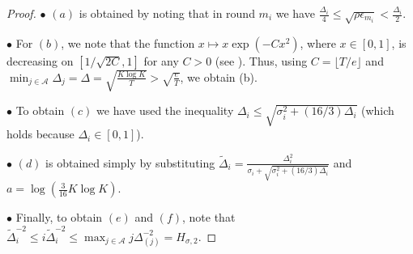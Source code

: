 \begin{proof}
\noindent
 $\bullet$ $(a)$ is obtained by noting that in round $m_i$ we have 
 $\frac{\Delta_i}{4}\leq\sqrt{\rho\epsilon_{m_{i}}}<\frac{\Delta_i}{2}.$

\noindent
 $\bullet$ For $(b)$, we note that the function $x\mapsto x\exp(-Cx^2)$, where $x\in[0,1]$, is  decreasing on $[1/\sqrt{2C},1]$ for any $C>0$ (see \cite{bubeck2011pure,auer2010ucb}). Thus, using $C=\lfloor T/e\rfloor$ and $\min_{j\in \mathcal{A}}\Delta_j =\Delta =\sqrt{\frac{K\log K}{T}} > \sqrt{\frac{e}{T}}$,
we obtain (b).

\noindent
 $\bullet$
To obtain $(c)$ we have used the inequality $\Delta_i\le \sqrt{\sigma_{i}^{2} + (16/3)\Delta_{i}}$ (which holds because $\Delta_i\in[0,1]$).

\noindent
 $\bullet$
 $(d)$ is obtained simply by substituting $\tilde{\Delta}_i=\frac{\Delta_{i}^{2}}{\sigma_{i}+\sqrt{\sigma_{i}^{2}+(16/3)\Delta_{i}}}$ and $a=\log(\frac{3}{16} K\log K)$.
 
 \noindent
 $\bullet$
 Finally, to obtain $(e)$ and $(f)$, note that 
$\tilde{\Delta}_i^{-2}\le i\tilde{\Delta}_i^{-2} \le \max_{j\in\mathcal{A}}j\Delta_{(j)}^{-2}=H_{\sigma,2}.$
\end{proof}

  

